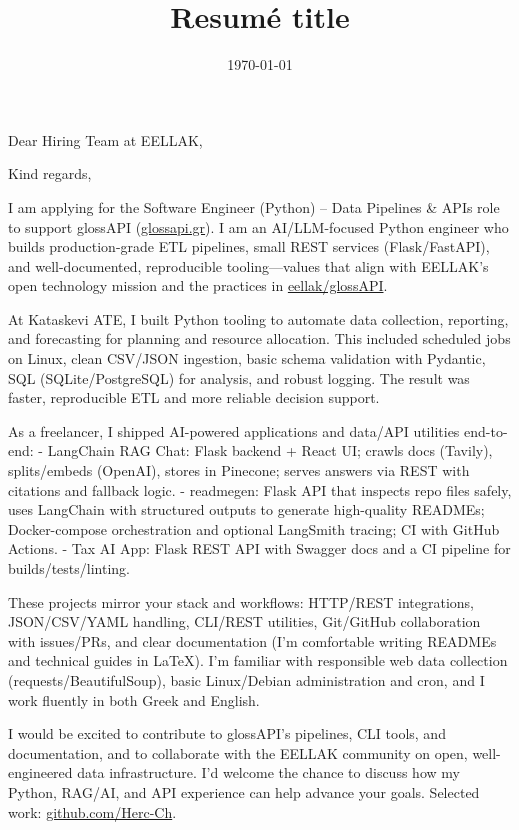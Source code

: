 \documentclass[11pt,a4paper,sans]{moderncv}
\title{Resumé title}
\begin{document}
\date{\today}
\opening{Dear Hiring Team at EELLAK,}
\closing{Kind regards,}

\makelettertitle

I am applying for the Software Engineer (Python) – Data Pipelines \& APIs role to support glossAPI (\href{https://glossapi.gr/}{glossapi.gr}). I am an AI/LLM-focused Python engineer who builds production-grade ETL pipelines, small REST services (Flask/FastAPI), and well-documented, reproducible tooling—values that align with EELLAK’s open technology mission and the practices in \href{https://github.com/eellak/glossAPI}{eellak/glossAPI}.

At Kataskevi ATE, I built Python tooling to automate data collection, reporting, and forecasting for planning and resource allocation. This included scheduled jobs on Linux, clean CSV/JSON ingestion, basic schema validation with Pydantic, SQL (SQLite/PostgreSQL) for analysis, and robust logging. The result was faster, reproducible ETL and more reliable decision support.

As a freelancer, I shipped AI-powered applications and data/API utilities end-to-end:
- LangChain RAG Chat: Flask backend + React UI; crawls docs (Tavily), splits/embeds (OpenAI), stores in Pinecone; serves answers via REST with citations and fallback logic.
- readmegen: Flask API that inspects repo files safely, uses LangChain with structured outputs to generate high-quality READMEs; Docker-compose orchestration and optional LangSmith tracing; CI with GitHub Actions.
- Tax AI App: Flask REST API with Swagger docs and a CI pipeline for builds/tests/linting.

These projects mirror your stack and workflows: HTTP/REST integrations, JSON/CSV/YAML handling, CLI/REST utilities, Git/GitHub collaboration with issues/PRs, and clear documentation (I’m comfortable writing READMEs and technical guides in LaTeX). I’m familiar with responsible web data collection (requests/BeautifulSoup), basic Linux/Debian administration and cron, and I work fluently in both Greek and English.

I would be excited to contribute to glossAPI’s pipelines, CLI tools, and documentation, and to collaborate with the EELLAK community on open, well-engineered data infrastructure. I’d welcome the chance to discuss how my Python, RAG/AI, and API experience can help advance your goals. Selected work: \href{https://github.com/Herc-Ch}{github.com/Herc-Ch}.

\makeletterclosing

\end{document}
